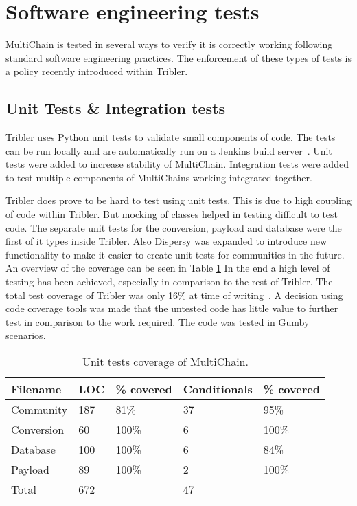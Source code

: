 \section{Software engineering tests}
MultiChain is tested in several ways to verify it is correctly working
following standard software engineering practices.
The enforcement of these types of tests is a policy recently introduced within Tribler.

\subsection{Unit Tests \& Integration tests}
Tribler uses Python unit tests to validate small components of code.
The tests can be run locally and
are automatically run on a Jenkins build server~\cite{jenkins,jenkins-tribler}.
Unit tests were added to increase stability of MultiChain.
Integration tests were added to test multiple components of MultiChains working integrated together.

Tribler does prove to be hard to test using unit tests.
This is due to high coupling of code within Tribler.
But mocking of classes helped in testing difficult to test code.
The separate unit tests for the conversion, payload and database were the first of it types inside Tribler.
Also Dispersy was expanded to introduce new functionality to make it easier to create unit tests for communities in the future.
An overview of the coverage can be seen in Table \ref{tab:tests}
In the end a high level of testing has been achieved, especially in comparison to the rest of Tribler.
The total test coverage of Tribler was only 16\% at time of writing~\cite{jenkins-tribler}.
A decision using code coverage tools was made that the untested code has little value to further test in comparison to the work required.
The code was tested in Gumby scenarios.

\begin{table}
\centering
\begin{tabular}{l|ll|ll}
Filename   & LOC & \% covered   & Conditionals & \% covered    \\ \hline
Community  & 187 & 81\%         & 37           & 95\%  \\
Conversion & 60  & 100\%        & 6            & 100\%  \\
Database   & 100 & 100\%        & 6            & 84\%  \\
Payload    & 89  & 100\%        & 2            & 100\% \\ \hline
Total      & 672 &              & 47           &
\end{tabular}
\caption{Unit tests coverage of MultiChain.}
\label{tab:tests}
\end{table}

